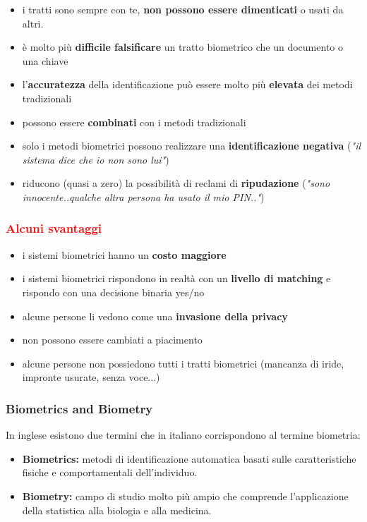 \documentclass{report}
\begin{document}
\begin{itemize}
    \item i tratti sono sempre con te, \textbf{non possono essere dimenticati} o usati da altri.
    \item è molto più \textbf{difficile falsificare} un tratto biometrico che un documento o una chiave
    \item l'\textbf{accuratezza} della identificazione può essere molto più \textbf{elevata} dei metodi tradizionali
    \item possono essere \textbf{combinati} con i metodi tradizionali
    \item solo i metodi biometrici possono realizzare una \textbf{identificazione negativa} (\textit{"il sistema dice che io non sono lui"})
    \item riducono (quasi a zero) la possibilità di reclami di \textbf{ripudazione} (\textit{"sono innocente..qualche altra persona ha usato il mio PIN.."})
\end{itemize}

\subsubsection{\textcolor{red}{Alcuni svantaggi}}

\begin{itemize}
    \item i sistemi biometrici hanno un \textbf{costo maggiore}
    \item i sistemi biometrici rispondono in realtà con un \textbf{livello di matching} e rispondo con una decisione binaria yes/no
    \item alcune persone li vedono come una \textbf{invasione della privacy}
    \item non possono essere cambiati a piacimento
    \item alcune persone non possiedono tutti i tratti biometrici (mancanza di iride, impronte usurate, senza voce...)
\end{itemize}

\subsubsection{Biometrics and Biometry}

In inglese esistono due termini che in italiano corrispondono al termine biometria:
\begin{itemize}
    \item \textbf{Biometrics:} metodi di identificazione automatica basati sulle caratteristiche fisiche e comportamentali dell'individuo.
    \item \textbf{Biometry:} campo di studio molto più ampio che comprende l'applicazione della statistica alla biologia e alla medicina.
\end{itemize}
\end{document}
